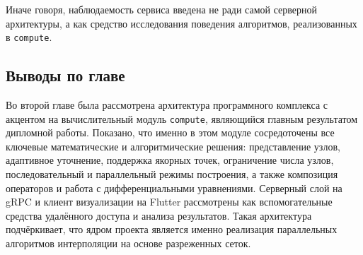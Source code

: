 Иначе говоря, наблюдаемость сервиса введена не ради самой серверной архитектуры, а как средство исследования поведения алгоритмов, реализованных в \texttt{compute}.

\subsection*{Выводы по главе}

Во второй главе была рассмотрена архитектура программного комплекса с акцентом на вычислительный модуль \texttt{compute}, являющийся главным результатом дипломной работы. Показано, что именно в этом модуле сосредоточены все ключевые математические и алгоритмические решения: представление узлов, адаптивное уточнение, поддержка якорных точек, ограничение числа узлов, последовательный и параллельный режимы построения, а также композиция операторов и работа с дифференциальными уравнениями. Серверный слой на gRPC и клиент визуализации на Flutter рассмотрены как вспомогательные средства удалённого доступа и анализа результатов. Такая архитектура подчёркивает, что ядром проекта является именно реализация параллельных алгоритмов интерполяции на основе разреженных сеток.
